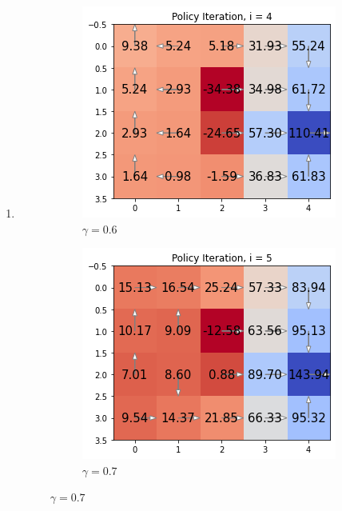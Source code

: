 \documentclass[submit]{harvardml}
\begin{document}
\begin{enumerate}
	\item 
	\begin{figure}
		\centering
		\begin{subfigure}[b]{0.475\textwidth}
			\centering
			\includegraphics[width=\textwidth]{Policy_gamma_06}
			\caption{\small $\gamma = 0.6$}
		\end{subfigure}
		\hfill
		\begin{subfigure}[b]{0.475\textwidth}  
			\centering 
			\includegraphics[width=\textwidth]{Policy_gamma_07}
			\caption{\small $\gamma = 0.7$}

\end{subfigure}
\end{figure}
\end{enumerate}
\end{document}
